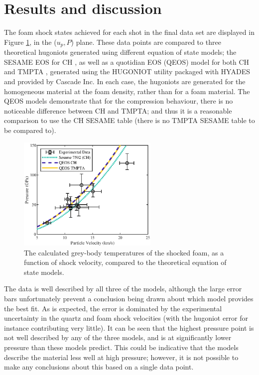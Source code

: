 \section{Results and discussion} \label{Experiment Results}

The foam shock states achieved for each shot in the final data set are displayed in Figure \ref{fig:Hugoniot Results}, in the ($u_p,P$) plane. These data points are compared to three theoretical hugoniots generated using different equation of state models; the SESAME EOS for CH \cite{SESAME}, as well as a quotidian EOS (QEOS) model for both CH and TMPTA \cite{More1988}, generated using the HUGONIOT utility packaged with HYADES and provided by Cascade Inc. In each case, the hugoniots are generated for the homogeneous material at the foam density, rather than for a foam material. The QEOS models demonstrate that for the compression behaviour, there is no noticeable difference between CH and TMPTA; and thus it is a reasonable comparison to use the CH SESAME table (there is no TMPTA SESAME table to be compared to).

\begin{figure} [h!]
\begin{centering}
\includegraphics[width=0.6\textwidth]{figures/Experiment/Hugoniot.eps}%
\caption{\label{fig:Hugoniot Results} The calculated grey-body temperatures of the shocked foam, as a function of shock velocity, compared to the theoretical equation of state models.}
\end{centering}
\end{figure}

The data is well described by all three of the models, although the large error bars unfortunately prevent a conclusion being drawn about which model provides the best fit. As is expected, the error is dominated by the experimental uncertainty in the quartz and foam shock velocities (with the hugoniot error for instance contributing very little). It can be seen that the highest pressure point is not well described by any of the three models, and is at significantly lower pressure than these models predict. This could be indicative that the models describe the material less well at high pressure; however, it is not possible to make any conclusions about this based on a single data point.

